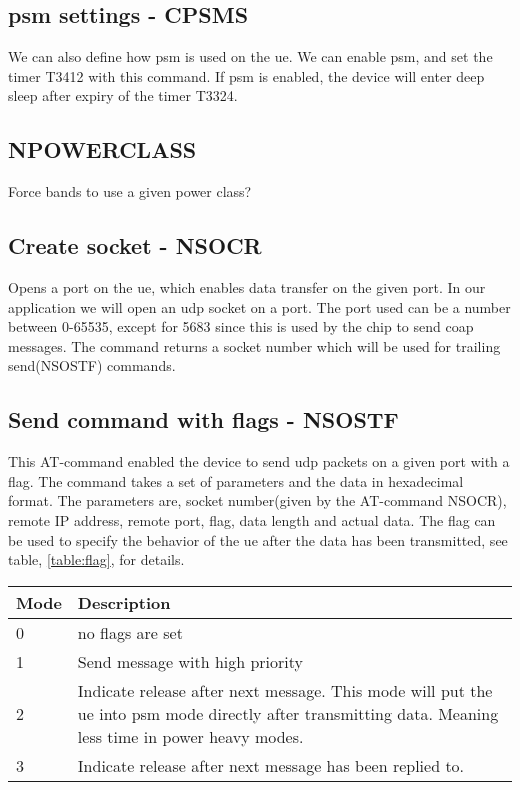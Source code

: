 \documentclass[USenglish]{ifimaster}  %
\begin{document}
\subsection{\acrshort{psm} settings - CPSMS}
We can also define how \acrshort{psm} is used on the \acrshort{ue}. We can enable \acrshort{psm}, and set the timer \acrfull{T3412} with this command. If \acrshort{psm} is enabled, the device will enter deep sleep after expiry of the timer \acrfull{T3324}.

\subsection{NPOWERCLASS}
Force bands to use a given power class?

\subsection{Create socket - NSOCR}
Opens a port on the \acrshort{ue}, which enables data transfer on the given port. In our application we will open an \acrshort{udp} socket on a port. The port used can be a number between 0-65535, except for 5683 since this is used by the chip to send coap messages. The command returns a socket number which will be used for trailing send(NSOSTF) commands.

\subsection{Send command with flags - NSOSTF}
This AT-command enabled the device to send \acrshort{udp} packets on a given port with a flag. The command takes a set of parameters and the data in hexadecimal format. The parameters are, socket number(given by the AT-command NSOCR), remote IP address, remote port, flag, data length and actual data. The flag can be used to specify the behavior of the \acrshort{ue} after the data has been transmitted, see table, \vref{table:flag}, for details.

\begin{center} \label{table:flag}
  \begin{tabular}{ | l | m{10cm} | }
    \hline
    Mode & Description \\
    \hline
    0 & no flags are set \\
    \hline
    1 & Send message with high priority \\
    \hline
    2 & Indicate release after next message. This mode will put the \acrshort{ue} into \acrshort{psm} mode directly after transmitting data. Meaning less time in power heavy modes. \\
    \hline
    3 & Indicate release after next message has been replied to. \\
    \hline
  \end{tabular}
\end{center}
\end{document}
